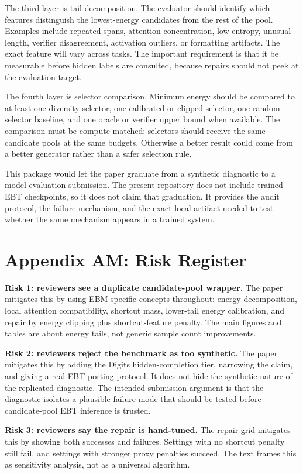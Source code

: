 \documentclass{article}
\begin{document}
The third layer is tail decomposition. The evaluator should identify which
features distinguish the lowest-energy candidates from the rest of the pool.
Examples include repeated spans, attention concentration, low entropy, unusual
length, verifier disagreement, activation outliers, or formatting artifacts.
The exact feature will vary across tasks. The important requirement is that it
be measurable before hidden labels are consulted, because repairs should not
peek at the evaluation target.

The fourth layer is selector comparison. Minimum energy should be compared to
at least one diversity selector, one calibrated or clipped selector, one
random-selector baseline, and one oracle or verifier upper bound when
available. The comparison must be compute matched: selectors should receive
the same candidate pools at the same budgets. Otherwise a better result could
come from a better generator rather than a safer selection rule.

This package would let the paper graduate from a synthetic diagnostic to a
model-evaluation submission. The present repository does not include trained
EBT checkpoints, so it does not claim that graduation. It provides the audit
protocol, the failure mechanism, and the exact local artifact needed to test
whether the same mechanism appears in a trained system.

\section*{Appendix AM: Risk Register}

\textbf{Risk 1: reviewers see a duplicate candidate-pool wrapper.} The paper
mitigates this by using EBM-specific concepts throughout: energy decomposition,
local attention compatibility, shortcut mass, lower-tail energy calibration,
and repair by energy clipping plus shortcut-feature penalty. The main figures
and tables are about energy tails, not generic sample count improvements.

\textbf{Risk 2: reviewers reject the benchmark as too synthetic.} The paper
mitigates this by adding the Digits hidden-completion tier, narrowing the
claim, and giving a real-EBT porting protocol. It does not hide the synthetic
nature of the replicated diagnostic. The intended submission argument is that
the diagnostic isolates a plausible failure mode that should be tested before
candidate-pool EBT inference is trusted.

\textbf{Risk 3: reviewers say the repair is hand-tuned.} The repair grid
mitigates this by showing both successes and failures. Settings with no
shortcut penalty still fail, and settings with stronger proxy penalties
succeed. The text frames this as sensitivity analysis, not as a universal
algorithm.
\end{document}
